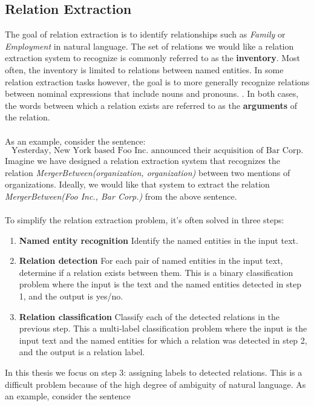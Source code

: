 \subsection{Relation Extraction}
\label{relation_extract}
The goal of relation extraction is to identify relationships such as \textit{Family} or \textit{Employment} in natural language. The set of relations we would like a relation extraction system to recognize is commonly referred to as the \textbf{inventory}. Most often, the inventory is limited to relations between named entities. In some relation extraction tasks however, the goal is to more generally recognize relations between nominal expressions that include nouns and pronouns. \citep{hendrickx2009}. In both cases, the words between which a relation exists are referred to as the \textbf{arguments} of the relation.
\\\\
As an example, consider the sentence: 
$$
\text{Yesterday, New York based Foo Inc. announced their acquisition of Bar Corp.}
$$ 
Imagine we have designed a relation extraction system that recognizes the relation \textit{MergerBetween(organization, organization)} between two mentions of organizations. Ideally, we would like that system to extract the relation \textit{MergerBetween(Foo Inc., Bar Corp.)} from the above sentence.
\\\\
To simplify the relation extraction problem, it's often solved in three steps:
\begin{enumerate}
	\item \textbf{Named entity recognition} \enspace Identify the named entities in the input text.
	\item \textbf{Relation detection} \enspace For each pair of named entities in the input text, determine if a relation exists between them. This is a binary classification problem where the input is the text and the named entities detected in step 1, and the output is yes/no.
	\item \textbf{Relation classification} \enspace Classify each of the detected relations in the previous step. This a multi-label classification problem where the input is the input text and the named entities for which a relation was detected in step 2, and the output is a relation label.
\end{enumerate}
In this thesis we focus on step 3: assigning labels to detected relations. This is a difficult problem because of the high degree of ambiguity of natural language. As an example, consider the sentence 
